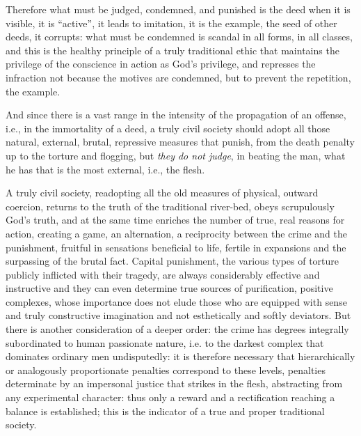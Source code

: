 Therefore what must be judged, condemned, and punished is the deed when it is visible, it is ``active'', it leads to imitation, it is the example, the seed of other deeds, it corrupts: what must be condemned is scandal in all forms, in all classes, and this is the healthy principle of a truly traditional ethic that maintains the privilege of the conscience in action as God's privilege, and represses the infraction not because the motives are condemned, but to prevent the repetition, the example.

And since there is a vast range in the intensity of the propagation of an offense, i.e., in the immortality of a deed, a truly civil society should adopt all those natural, external, brutal, repressive measures that punish, from the death penalty up to the torture and flogging, but
\emph{they do not judge}, in beating the man, what he has that is the most external, i.e., the flesh.

A truly civil society, readopting all the old measures of physical, outward coercion, returns to the truth of the traditional river-bed, obeys scrupulously God's truth, and at the same time enriches the number of true, real reasons for action, creating a game, an alternation, a reciprocity between the crime and the punishment, fruitful in sensations beneficial to life, fertile in expansions and the surpassing of the brutal fact. Capital punishment, the various types of torture publicly inflicted with their tragedy, are always considerably effective and instructive and they can even determine true sources of purification, positive complexes, whose importance does not elude those who are equipped with sense and truly constructive imagination and not esthetically and softly deviators. But there is another consideration of a deeper order: the crime has degrees integrally subordinated to human passionate nature, i.e. to the darkest complex that dominates ordinary men undisputedly: it is therefore necessary that hierarchically or analogously proportionate penalties correspond to these levels, penalties determinate by an impersonal justice that strikes in the flesh, abstracting from any experimental character: thus only a reward and a rectification reaching a balance is established; this is the indicator of a true and proper traditional society.

